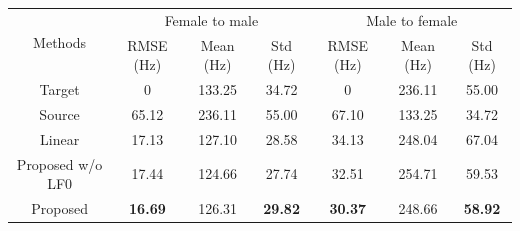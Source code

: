 

\begin{table} 
    \centering 

    \begin{tabular}[t]{ ccccccc }
        \toprule
        \multirow{2}{*}{Methods} & \multicolumn{3}{c}{Female to male} & \multicolumn{3}{c}{Male to female} \\
        \cline{2-7}
        & RMSE (Hz) & Mean (Hz) & Std (Hz) & RMSE (Hz) & Mean (Hz) & Std (Hz) \\
        \midrule
        Target                  & 0 & 133.25 & 34.72 &   0 & 236.11 & 55.00          \\
        \midrule
        Source                    & 65.12 & 236.11 & 55.00  & 67.10 & 133.25 & 34.72          \\
        Linear                       & 17.13 & 127.10 & 28.58  & 34.13 & 248.04 & 67.04             \\
        Proposed w/o LF0                       & 17.44 & 124.66 & 27.74   & 32.51 & 254.71 & 59.53         \\
        Proposed                       & \textbf{16.69} & 126.31 & \textbf{29.82}   & \textbf{30.37} & 248.66 & \textbf{58.92} \\
        \bottomrule
        \end{tabular} 

\end{table}
